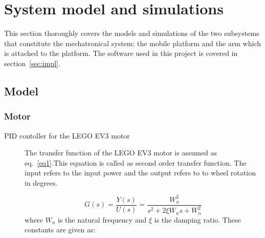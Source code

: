 \section{System model and simulations}
This section thoroughly covers the models and simulations of the two subsystems that constitute the mechatronical system:
the mobile platform and the arm which is attached to the platform.
The software used in this project is covered in section~\ref{sec:impl}.

\subsection{Model}
\subsubsection{Motor}
\begin{description}
\item[PID contoller for the LEGO EV3 motor]
The transfer function of the LEGO EV3 motor is assumed as eq.~\eqref{eq1}.This equation is called as second order transfer function. The input refers to the input power and the output refers to to wheel rotation in degrees.

\begin{equation}\label{eq1}
    G(s)=\frac{Y(s)}{U(s)}=\frac{W_n^2}{s^2+2\xi W_n s + W_n^2}
\end{equation}
where $W_n$ is the natural frequency and $\xi$ is the damping ratio.  These constants are given as:


\end{description}
